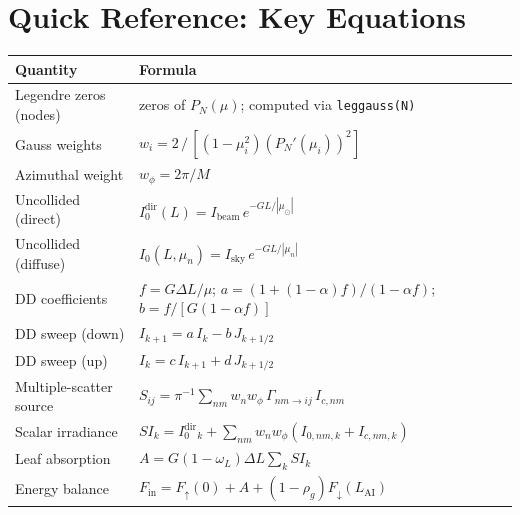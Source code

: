 \documentclass[12pt]{article}
\begin{document}
\section{Quick Reference: Key Equations}

\begin{center}
\renewcommand{\arraystretch}{1.6}
\begin{tabular}{ll}
  \toprule
  Quantity & Formula \\
  \midrule
  Legendre zeros (nodes) & zeros of $P_N(\mu)$; computed via \texttt{leggauss(N)} \\
  Gauss weights & $w_i = 2\,/\,[(1-\mu_i^2)(P_N'(\mu_i))^2]$ \\
  Azimuthal weight & $w_\phi = 2\pi/M$ \\
  Uncollided (direct) & $I_0^\mathrm{dir}(L) = I_\mathrm{beam}\,e^{-GL/|\mu_\odot|}$ \\
  Uncollided (diffuse) & $I_0(L,\mu_n) = I_\mathrm{sky}\,e^{-GL/|\mu_n|}$ \\
  DD coefficients & $f = G\Delta L/\mu$;\; $a=(1+(1{-}\alpha)f)/(1-\alpha f)$;\;
                    $b=f/[G(1-\alpha f)]$ \\
  DD sweep (down) & $I_{k+1} = a\,I_k - b\,J_{k+1/2}$ \\
  DD sweep (up) & $I_k = c\,I_{k+1} + d\,J_{k+1/2}$ \\
  Multiple-scatter source & $S_{ij} = \pi^{-1}\sum_{nm}w_n w_\phi\,\Gamma_{nm\to ij}\,I_{c,nm}$ \\
  Scalar irradiance & $SI_k = I_0^\mathrm{dir}{}_k + \sum_{nm}w_n w_\phi(I_{0,nm,k}+I_{c,nm,k})$ \\
  Leaf absorption & $A = G(1-\omega_L)\Delta L\sum_k SI_k$ \\
  Energy balance & $F_\mathrm{in} = F_\uparrow(0) + A + (1-\rho_g)F_\downarrow(L_\mathrm{AI})$ \\
  \bottomrule
\end{tabular}
\end{center}
\end{document}
